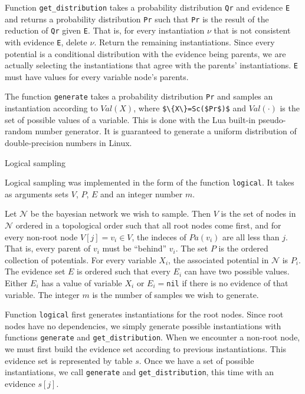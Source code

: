 \documentclass{amsart}
\makeatletter
\def\subsection{\@startsection{subsection}{3}%
  \z@{.5\linespacing\@plus.7\linespacing}{.1\linespacing}%
  {\normalfont\itshape}}
\theoremstyle{plain}
\newcommand{\code}[1]{\lstinline[mathescape=true]{#1}}
\newcommand{\mcode}[1]{\lstinline[mathescape]!#1!}
\makeatother
\begin{document}
Function \code{get_distribution} takes a probability distribution \code{Qr} and evidence \code{E}
and returns a probability distribution \code{Pr} such that \code{Pr} is the result of the reduction
of \code{Qr} given \code{E}. That is, for every instantiation $\nu$ that is not consistent with
evidence \code{E}, delete $\nu$. Return the remaining instantiations. Since every potential is a
conditional distribution with the evidence being parents, we are actually selecting the
instantiations that agree with the parents' instantiations. \code{E} must have values for every
variable node's parents.

The function \code{generate} takes a probability distribution \code{Pr} and samples an
instantiation according to $Val(X)$, where \mcode{$\{X\}=Sc($Pr$)$} and $Val(\cdot)$ is the set of
possible values of a variable. This is done with the Lua built-in pseudo-random number generator.
It is guaranteed to generate a uniform distribution of double-precision numbers in Linux.

\subsection{Logical sampling}

Logical sampling was implemented in the form of the function \code{logical}. It takes as arguments
sets $V$, $P$, $E$ and an integer number $m$.

Let $\mathcal{N}$ be the bayesian network we wish to sample. Then $V$ is the set of nodes in
$\mathcal{N}$ ordered in a topological order such that all root nodes come first, and for every
non-root node $V[j]=v_i \in V$, the indeces of $Pa(v_i)$ are all less than $j$. That is, every
parent of $v_i$ must be ``behind'' $v_i$. The set $P$ is the ordered collection of potentials. For
every variable $X_i$, the associated potential in $\mathcal{N}$ is $P_i$. The evidence set $E$ is
ordered such that every $E_i$ can have two possible values. Either $E_i$ has a value of variable
$X_i$ or $E_i=$\code{nil} if there is no evidence of that variable. The integer $m$ is the number
of samples we wish to generate.

Function \code{logical} first generates instantiations for the root nodes. Since root nodes have no
dependencies, we simply generate possible instantiations with functions \code{generate} and
\code{get_distribution}. When we encounter a non-root node, we must first build the evidence set
according to previous instantiations. This evidence set is represented by table $s$. Once we have
a set of possible instantiations, we call \code{generate} and \code{get_distribution}, this time
with an evidence $s[j]$.
\end{document}
